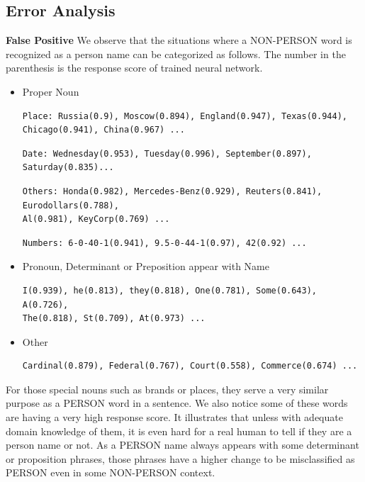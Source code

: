 \documentclass[letterpaper]{article}
\begin{document}
\subsection{Error Analysis}

\textbf{False Positive} We observe that the situations where a NON-PERSON word is recognized as a person name can be categorized as follows. The number in the parenthesis is the response score of trained neural network.
\begin{itemize}
\item Proper Noun
\begin{verbatim}
Place: Russia(0.9), Moscow(0.894), England(0.947), Texas(0.944),
Chicago(0.941), China(0.967) ...
\end{verbatim}
\begin{verbatim}
Date: Wednesday(0.953), Tuesday(0.996), September(0.897), Saturday(0.835)...
\end{verbatim}
\begin{verbatim}
Others: Honda(0.982), Mercedes-Benz(0.929), Reuters(0.841), Eurodollars(0.788),
Al(0.981), KeyCorp(0.769) ...
\end{verbatim}
\begin{verbatim}
Numbers: 6-0-40-1(0.941), 9.5-0-44-1(0.97), 42(0.92) ...
\end{verbatim}
\item Pronoun, Determinant or Preposition appear with Name
\begin{verbatim}
I(0.939), he(0.813), they(0.818), One(0.781), Some(0.643), A(0.726),
The(0.818), St(0.709), At(0.973) ...
\end{verbatim}
\item Other
\begin{verbatim}
Cardinal(0.879), Federal(0.767), Court(0.558), Commerce(0.674) ...
\end{verbatim}
\end{itemize}
For those special nouns such as brands or places, they serve a very similar purpose as a PERSON word in a sentence. We also notice some of these words are having a very high response score. It illustrates that unless with adequate domain knowledge of them, it is even hard for a real human to tell if they are a person name or not. As a PERSON name always appears with some determinant or proposition phrases, those phrases have a higher change to be misclassified as PERSON even in some NON-PERSON context. 

\vspace{0.1cm}
\end{document}
